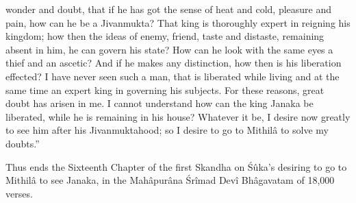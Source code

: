 wonder and doubt, that if he has got the sense of heat and cold, pleasure and pain, how can he be a Jivanmukta? That king is thoroughly expert in reigning his kingdom; how then the ideas of enemy, friend, taste and distaste, remaining absent in him, he can govern his state? How can he look with the same eyes a thief and an ascetic? And if he makes any distinction, how then is his liberation effected? I have never seen such a man, that is liberated while living and at the same time an expert king in governing his subjects. For these reasons, great doubt has arisen in me. I cannot understand how can the king Janaka be liberated, while he is remaining in his house? Whatever it be, I desire now greatly to see him after his Jivanmuktahood; so I desire to go to Mithil\^a to solve my doubts.''

Thus ends the Sixteenth Chapter of the first Skandha on \'S\^uka's desiring to go to Mithil\^a to see Janaka, in the Mah\^apur\^ana \'Sr\^imad Dev\^i Bh\^agavatam of 18,000 verses.